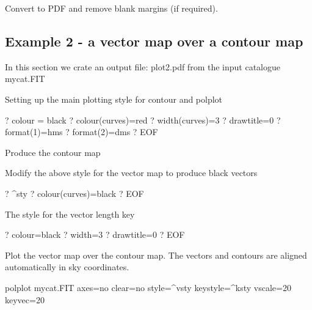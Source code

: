 Convert to PDF and remove blank margins (if required).

\begin{terminalv}
\end{terminalv}


\subsection{ Example 2 - a vector map over a contour map}
\label{section:kappa-example2}


In this section we crate an output file: plot2.pdf from the input catalogue mycat.FIT

\begin{terminalv}
\end{terminalv}

Setting up the main plotting style for contour and polplot

\begin{terminalv}
?   colour = black
?   colour(curves)=red
?   width(curves)=3
?   drawtitle=0
?   format(1)=hms
?   format(2)=dms
? EOF
\end{terminalv}


Produce the contour map

\begin{terminalv}
\end{terminalv}


Modify the above style for the vector map to produce black vectors

\begin{terminalv}
?   ^sty
?   colour(curves)=black
? EOF
\end{terminalv}


The style for the vector length key


\begin{terminalv}
?   colour=black
?   width=3
?   drawtitle=0
? EOF
\end{terminalv}

Plot the vector map over the contour map. The vectors and
contours are aligned automatically in sky coordinates.


\begin{terminalv}
polplot mycat.FIT axes=no clear=no style=^vsty keystyle=^ksty vscale=20 keyvec=20
\end{terminalv}

